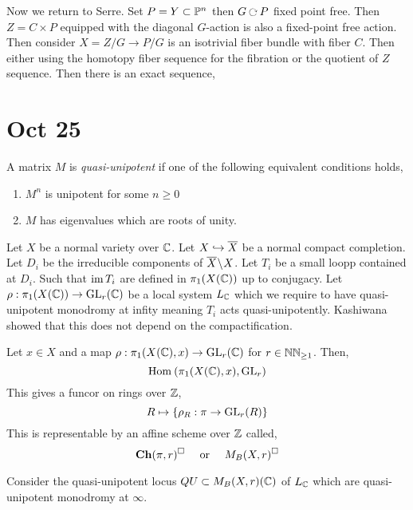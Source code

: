 \documentclass[12pt]{article}
\begin{document}
Now we return to Serre. Set $P = Y \subset \P^n$ then $G \acts P$ fixed point free. Then $Z  = C \times P$ equipped with the diagonal $G$-action is also a fixed-point free action. Then consider $X = Z / G \to P/G$ is an isotrivial fiber bundle with fiber $C$. Then either using the homotopy fiber sequence for the fibration or the quotient of $Z$ sequence. Then there is an exact sequence,
\begin{center}
\end{center}

\section{Oct 25}

\begin{defn}
A matrix $M$ is \textit{quasi-unipotent} if one of the following equivalent conditions holds,
\begin{enumerate}
\item $M^n$ is unipotent for some $n \ge 0$
\item $M$ has eigenvalues which are roots of unity.
\end{enumerate}
\end{defn}

Let $X$ be a normal variety over $\CC$. Let $X \embed \overline{X}$ be a normal compact completion. Let $D_i$ be the irreducible components of $\overline{X} \sm X$. Let $T_i$ be a small loopp contained at $D_i$. Such that $\im{T_i}$ are defined in $\pi_1(X(\CC))$ up to conjugacy. Let $\rho : \pi_1(X(\CC)) \to \GL_r(\CC)$ be a local system $L_{\CC}$ which we require to have quasi-unipotent monodromy at infity meaning $T_i$ acts quasi-unipotently. Kashiwana showed that this does not depend on the compactification.

\begin{defn}
Let $x \in X$ and a map $\rho : \pi_1(X(\CC), x) \to \GL_r(\CC)$ for $r \in \NN_{\ge 1}$. Then,
\[ \Hom{}{\pi_1(X(\CC), x)}{\GL_r} \]
This gives a funcor on rings over $\ZZ$,
\[ R \mapsto \{ \rho_{R} : \pi \to \GL_r(R) \} \]
This is representable by an affine scheme over $\ZZ$ called,
\[ \Ch(\pi, r)^{\square} \quad \text{ or } \quad M_B(X, r)^{\square} \]
\end{defn}

\begin{defn}
Consider the quasi-unipotent locus $QU \subset M_B(X, r)(\CC)$ of $L_{\CC}$ which are quasi-unipotent monodromy at $\infty$.
\end{defn}
\end{document}
